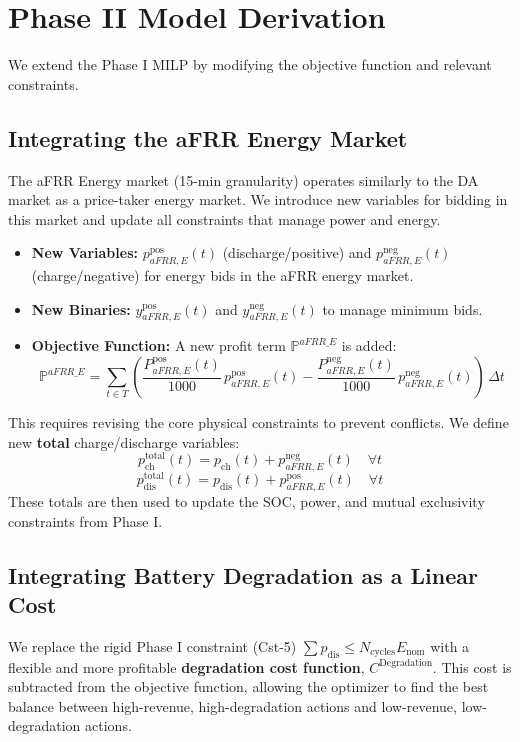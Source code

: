 \documentclass[11pt, a4paper]{article}
\begin{document}
\section{Phase II Model Derivation}
We extend the Phase I MILP by modifying the objective function and relevant constraints.

\subsection{Integrating the aFRR Energy Market}
The aFRR Energy market (15-min granularity) operates similarly to the DA market as a price-taker energy market. We introduce new variables for bidding in this market and update all constraints that manage power and energy.

\begin{itemize}
    \item \textbf{New Variables:} $p^{\mathrm{pos}}_{aFRR,E}(t)$ (discharge/positive) and $p^{\mathrm{neg}}_{aFRR,E}(t)$ (charge/negative) for energy bids in the aFRR energy market.
    \item \textbf{New Binaries:} $y^{\mathrm{pos}}_{aFRR,E}(t)$ and $y^{\mathrm{neg}}_{aFRR,E}(t)$ to manage minimum bids.
    \item \textbf{Objective Function:} A new profit term $\mathbb{P}^{aFRR\_E}$ is added:
    $$ \mathbb{P}^{aFRR\_E} = \sum_{t\in T} \left( \frac{P^{\mathrm{pos}}_{aFRR, E}(t)}{1000}\, p^{\mathrm{pos}}_{aFRR, E}(t) - \frac{P^{\mathrm{neg}}_{aFRR, E}(t)}{1000}\, p^{\mathrm{neg}}_{aFRR, E}(t) \right)\, \Delta t $$
\end{itemize}

This requires revising the core physical constraints to prevent conflicts. We define new \textbf{total} charge/discharge variables:
$$ p^{\mathrm{total}}_{\mathrm{ch}}(t) = p_{\mathrm{ch}}(t) + p^{\mathrm{neg}}_{aFRR,E}(t) \quad \forall t $$
$$ p^{\mathrm{total}}_{\mathrm{dis}}(t) = p_{\mathrm{dis}}(t) + p^{\mathrm{pos}}_{aFRR,E}(t) \quad \forall t $$
These totals are then used to update the SOC, power, and mutual exclusivity constraints from Phase I.

\subsection{Integrating Battery Degradation as a Linear Cost}
We replace the rigid Phase I constraint (Cst-5) $\sum p_{\mathrm{dis}} \le N_{\mathrm{cycles}} E_{\mathrm{nom}}$ with a flexible and more profitable \textbf{degradation cost function}, $C^{\mathrm{Degradation}}$. This cost is subtracted from the objective function, allowing the optimizer to find the best balance between high-revenue, high-degradation actions and low-revenue, low-degradation actions.
\end{document}
